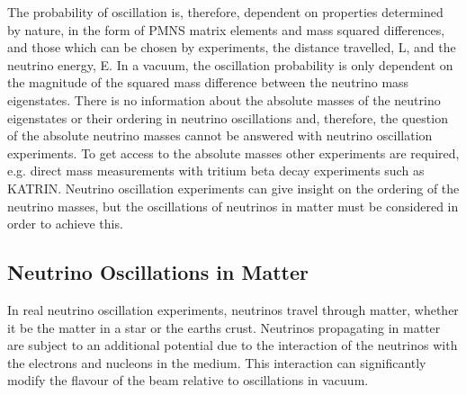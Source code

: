The probability of oscillation is, therefore, dependent on properties determined
by nature, in the form of PMNS matrix elements and mass squared differences, and
those which can be chosen by experiments, the distance travelled, L, and the
neutrino energy, E. In a vacuum, the oscillation probability is only dependent 
on the magnitude of the squared mass difference between the neutrino mass
eigenstates. There is no information about the absolute masses of the 
neutrino eigenstates or their ordering in neutrino oscillations and, therefore,
the question of the absolute neutrino masses cannot be answered with neutrino 
oscillation experiments. To get access to the absolute masses other 
experiments are required, e.g. direct mass measurements with tritium beta 
decay experiments such as KATRIN\cite{Aker:2019qfn}. Neutrino oscillation 
experiments can give insight on the ordering of the neutrino masses, but
the oscillations of neutrinos in matter must be considered in order to achieve
this.

\subsection{Neutrino Oscillations in Matter}
In real neutrino oscillation experiments, neutrinos travel through matter,
whether it be the matter in a star or the earths crust. Neutrinos propagating in
matter are subject to an additional potential due to the interaction of the 
neutrinos with the electrons and nucleons in the medium.  This interaction can 
significantly modify the flavour of the beam relative to oscillations in 
vacuum.

